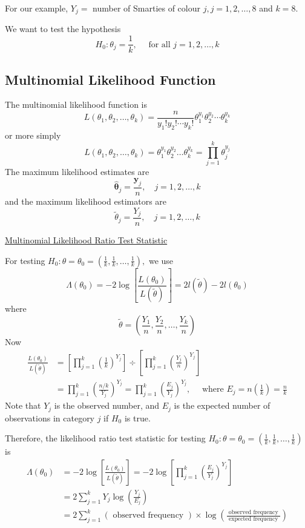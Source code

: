 For our example, $Y_{j}=$ number of Smarties of colour $j, j=1,2, \ldots, 8$ and $k=8$.

We want to test the hypothesis
\[ H_{0}: \theta_{j}=\frac{1}{k}, \quad \text { for all } j=1,2, \ldots, k \]

\subsection{Multinomial Likelihood Function}
The multinomial likelihood function is
\[
    L\left(\theta_{1}, \theta_{2}, \ldots, \theta_{k}\right)=\frac{n}{y_{1} ! y_{2} ! \cdots y_{k} !} \theta_{1}^{y_{1}} \theta_{2}^{y_{2}} \cdots \theta_{k}^{y_{k}}
\]
or more simply
\[
    L\left(\theta_{1}, \theta_{2}, \ldots, \theta_{k}\right)=\theta_{1}^{y_{1}} \theta_{2}^{y_{2}} \ldots \theta_{k}^{y_{k}}=\prod_{j=1}^{k} \theta_{j}^{y_{j}}
\]
The maximum likelihood estimates are
\[
    \hat{\bm{\theta}}_{j}=\frac{\bm{y}_{j}}{n}, \quad j=1,2, \ldots, k
\]
and the maximum likelihood estimators are
\[
    \tilde{\theta}_{j}=\frac{Y_{j}}{n}, \quad j=1,2, \ldots, k
\]

\underline{Multinomial Likelihood Ratio Test Statistic}

For testing $H_{0}: \theta=\theta_{0}=\left(\frac{1}{k}, \frac{1}{k}, \ldots, \frac{1}{k}\right),$ we use
\[
    \Lambda\left(\theta_{0}\right)=-2 \log \left[\frac{L\left(\theta_{0}\right)}{L(\tilde{\theta})}\right]=2 l(\tilde{\theta})-2 l\left(\theta_{0}\right)
\]
where
\[
    \tilde{\theta}=\left(\frac{Y_{1}}{n}, \frac{Y_{2}}{n}, \ldots, \frac{Y_{k}}{n}\right)
\]
Now
\[
    \begin{aligned}
        \frac{L\left(\theta_{0}\right)}{L(\tilde{\theta})} & =\left[\prod_{j=1}^{k}\left(\frac{1}{k}\right)^{Y_{j}}\right] \div\left[\prod_{j=1}^{k}\left(\frac{Y_{j}}{n}\right)^{Y_{j}}\right]                                                  \\
                                                           & =\prod_{j=1}^{k}\left(\frac{n / k}{Y_{j}}\right)^{Y_{j}}=\prod_{j=1}^{k}\left(\frac{E_{j}}{Y_{j}}\right)^{Y_{j}}, \quad \text { where } E_{j}=n\left(\frac{1}{k}\right)=\frac{n}{k}
    \end{aligned}
\]
Note that $Y_{j}$ is the observed number, and $E_{j}$ is the expected number of observations in category $j$ if $H_{0}$ is true.

Therefore, the likelihood ratio test statistic for testing $H_{0}: \theta=\theta_{0}=\left(\frac{1}{k}, \frac{1}{k}, \ldots, \frac{1}{k}\right)$ is
\[
    \begin{aligned}
        \Lambda\left(\theta_{0}\right) & =-2 \log \left[\frac{L\left(\theta_{0}\right)}{L(\tilde{\theta})}\right]=-2 \log \left[\prod_{j=1}^{k}\left(\frac{E_{j}}{Y_{j}}\right)^{Y_{j}}\right] \\
                                       & =2 \sum_{j=1}^{k} Y_{j} \log \left(\frac{Y_{j}}{E_{j}}\right)                                                                                         \\
                                       & =2 \sum_{j=1}^{k}(\text { observed frequency }) \times \log \left(\frac{\text { observed frequency }}{\text { expected frequency }}\right)
    \end{aligned}
\]

